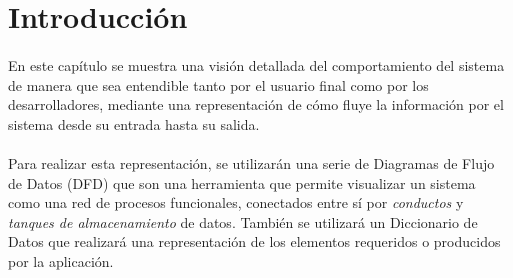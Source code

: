 \section{Introducción}

  \paragraph{}En este capítulo se muestra una visión detallada del
  comportamiento del sistema de manera que sea entendible tanto por el usuario
  final como por los desarrolladores, mediante una representación de cómo fluye
  la información por el sistema desde su entrada hasta su salida.

  \paragraph{}Para realizar esta representación, se utilizarán una serie de
  Diagramas de Flujo de Datos (DFD) que son una herramienta que permite
  visualizar un sistema como una red de procesos funcionales, conectados entre
  sí por \textit{conductos} y \textit{tanques de almacenamiento} de datos.
  También se utilizará un Diccionario de Datos que realizará una representación
  de los elementos requeridos o producidos por la aplicación.
